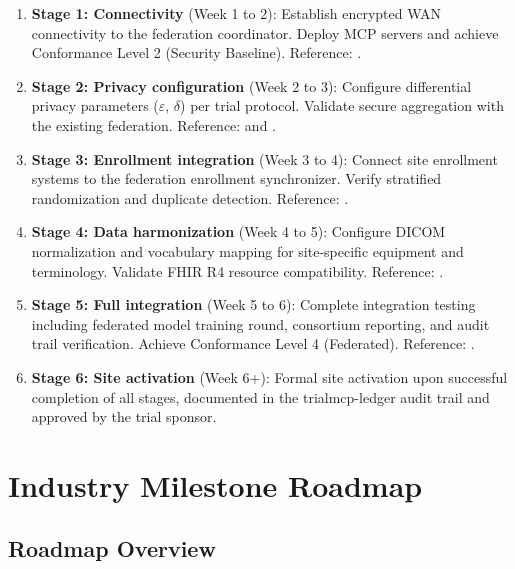 \documentclass[11pt,letterpaper]{article}
\begin{document}
\begin{enumerate}
  \item \textbf{Stage 1: Connectivity} (Week 1 to 2): Establish encrypted WAN connectivity to the federation coordinator. Deploy MCP servers and achieve Conformance Level 2 (Security Baseline). Reference: .

  \item \textbf{Stage 2: Privacy configuration} (Week 2 to 3): Configure differential privacy parameters ($\varepsilon$, $\delta$) per trial protocol. Validate secure aggregation with the existing federation. Reference:  and .

  \item \textbf{Stage 3: Enrollment integration} (Week 3 to 4): Connect site enrollment systems to the federation enrollment synchronizer. Verify stratified randomization and duplicate detection. Reference: .

  \item \textbf{Stage 4: Data harmonization} (Week 4 to 5): Configure DICOM normalization and vocabulary mapping for site-specific equipment and terminology. Validate FHIR R4 resource compatibility. Reference: .

  \item \textbf{Stage 5: Full integration} (Week 5 to 6): Complete integration testing including federated model training round, consortium reporting, and audit trail verification. Achieve Conformance Level 4 (Federated). Reference: .

  \item \textbf{Stage 6: Site activation} (Week 6+): Formal site activation upon successful completion of all stages, documented in the trialmcp-ledger audit trail and approved by the trial sponsor.
\end{enumerate}

\section{Industry Milestone Roadmap}
\label{sec:part8}

\subsection{Roadmap Overview}
\end{document}
